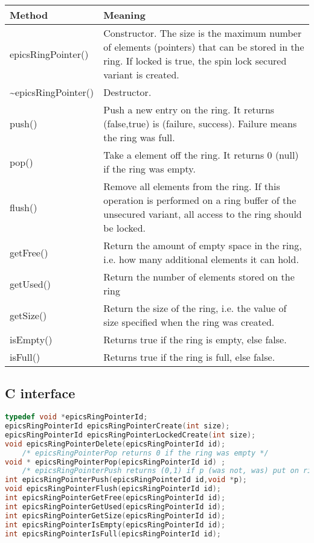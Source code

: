 \begin{center}
\begin{longtable}{p{1.27778in}p{5.0in}}
\textbf{Method} & \textbf{Meaning}\\
\hline
epicsRingPointer() & Constructor. The size is the maximum number of elements (pointers) that can be stored in the ring. If locked is true, the spin lock secured variant is created.\\
\~{}epicsRingPointer() & Destructor.\\
push() & Push a new entry on the ring. It returns (false,true) is (failure, success). Failure means the ring was full.\\
pop() & Take a element off the ring. It returns 0 (null) if the ring was empty.\\
flush() & Remove all elements from the ring. If this operation is performed on a ring buffer of the unsecured variant, all access to the ring should be locked.\\
getFree() & Return the amount of empty space in the ring, i.e. how many additional elements it can hold.\\
getUsed() & Return the number of elements stored on the ring\\
getSize() & Return the size of the ring, i.e. the value of size specified when the ring was created.\\
isEmpty() & Returns true if the ring is empty, else false.\\
isFull() & Returns true if the ring is full, else false.
\end{longtable}
\end{center}

\subsection{C interface}

\begin{lstlisting}[language=C]
typedef void *epicsRingPointerId;
epicsRingPointerId epicsRingPointerCreate(int size);
epicsRingPointerId epicsRingPointerLockedCreate(int size);
void epicsRingPointerDelete(epicsRingPointerId id);
    /* epicsRingPointerPop returns 0 if the ring was empty */
void * epicsRingPointerPop(epicsRingPointerId id) ;
    /* epicsRingPointerPush returns (0,1) if p (was not, was) put on ring */
int epicsRingPointerPush(epicsRingPointerId id,void *p);
void epicsRingPointerFlush(epicsRingPointerId id);
int epicsRingPointerGetFree(epicsRingPointerId id);
int epicsRingPointerGetUsed(epicsRingPointerId id);
int epicsRingPointerGetSize(epicsRingPointerId id);
int epicsRingPointerIsEmpty(epicsRingPointerId id);
int epicsRingPointerIsFull(epicsRingPointerId id);
\end{lstlisting}

